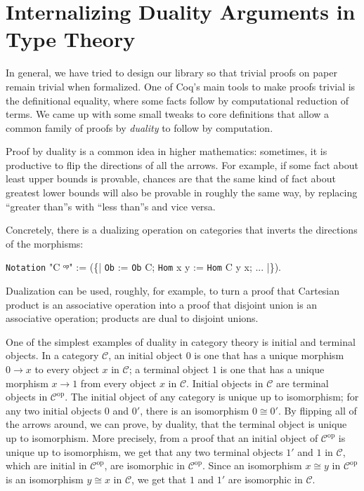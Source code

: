 \documentclass[runningheads]{llncs}
\makeatletter
\newcommand{\cat}[1]{\ensuremath{\mathcal{#1}}}
\gdef\@makeopenbrace<\catcode`{>
\gdef\@makeclosebrace<\catcode`}>
\newcommand{\processcommands}[1]{{%
  \catcode`\\=0\relax
  \@makeopenbrace=1\relax
  \@makeclosebrace=2\relax
  \def\{{\texttt{\mytextbraceleft}}
  \def\}{\texttt{\mytextbraceright}}
  \scantokens{#1}%
}}
\newcommand{\processcommandsinverbatimline}{\expandafter\processcommands\expandafter{\the\verbatim@line}}
\newenvironment{coqcode}{\begingroup
  \vspace{0.5\baselineskip}
  \let\trivlist\relax
  \let\endtrivlist\relax
  \let\item\relax
  \setlength{\parsep}{0pt}%
  \setlength{\parskip}{0pt}%
  \setlength{\topsep}{0pt}%
  \setlength{\@topsepadd}{0pt}%
  \setlength{\partopsep}{0pt}%
  \setlength{\@topsep}{0pt}%
  \let\old@@par\@@par
  \let\@@par\relax
  \let\old@vskip\vskip
  \let\vskip\relax
  \verbatim
  \let\@@par\old@@par
  \let\vskip\old@vskip
  \let\verbatim@processline=\processcommandsinverbatimline
}{\endverbatim\endgroup\vspace{0.5\baselineskip}}
\newcommand{\colortext}[2]{\textcolor{#1}{#2}}
\newcommand{\coqdockw}[1]{\texttt {\colortext{kwred}{#1}}}
\newcommand{\coqdocvar}[1]{\colortext{varpurple}{#1}}
\newcommand{\coqdoccst}[1]{\texttt{\colortext{defgreen}{#1}}}%
\newcommand{\coqdocvariable}[1]{\coqdocvar{#1}}
\newcommand{\coqdocprojection}[1]{\coqdoccst{#1}}
\makeatother
\begin{document}
\section{Internalizing Duality Arguments in Type Theory} \label{sec:duality-unification}
  In general, we have tried to design our library so that trivial proofs on paper remain trivial when formalized.  One of Coq's main tools to make proofs trivial is the definitional equality, where some facts follow by computational reduction of terms.  We came up with some small tweaks to core definitions that allow a common family of proofs by \emph{duality} to follow by computation.

  Proof by duality is a common idea in higher mathematics: sometimes, it is productive to flip the directions of all the arrows.  For example, if some fact about least upper bounds is provable, chances are that the same kind of fact about greatest lower bounds will also be provable in roughly the same way, by replacing ``greater than''s with ``less than''s and vice versa.

  Concretely, there is a dualizing operation on categories that inverts the directions of the morphisms:
\begin{coqcode}
\coqdockw{Notation} "C ᵒᵖ" := (\{| \coqdocprojection{Ob} := \coqdocprojection{Ob} \coqdocvariable{C}; \coqdocprojection{Hom} \coqdocvariable{x y} := \coqdocprojection{Hom} \coqdocvariable{C y x}; ... |\}).
\end{coqcode}

  Dualization can be used, roughly, for example, to turn a proof that Cartesian product is an associative operation into a proof that disjoint union is an associative operation; products are dual to disjoint unions.

  One of the simplest examples of duality in category theory is initial and terminal objects.  In a category \cat C, an initial object $0$ is one that has a unique morphism $0 \to x$ to every object $x$ in \cat C; a terminal object $1$ is one that has a unique morphism $x \to 1$ from every object $x$ in \cat C.  Initial objects in \cat C are terminal objects in $\cat{C}^\text{op}$.  The initial object of any category is unique up to isomorphism; for any two initial objects $0$ and $0'$, there is an isomorphism $0 \cong 0'$.  By flipping all of the arrows around, we can prove, by duality, that the terminal object is unique up to isomorphism.  More precisely, from a proof that an initial object of $\cat{C}^{\text{op}}$ is unique up to isomorphism, we get that any two terminal objects $1'$ and $1$ in $\cat{C}$, which are initial in $\cat{C}^{\text{op}}$, are isomorphic in $\cat{C}^{\text{op}}$.  Since an isomorphism $x \cong y$ in $\cat{C}^\text{op}$ is an isomorphism $y \cong x$ in \cat C, we get that $1$ and $1'$ are isomorphic in $\cat C$.
\end{document}
